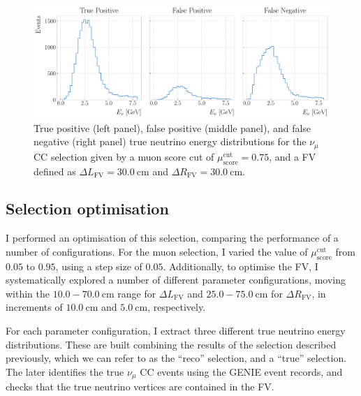 \begin{figure}[t]
    \centering
    \includegraphics[width=.99\linewidth]{Images/GAr_selection/true_numu_example_spectra_horizontal.pdf}
    \caption[True positive, false positive, and false negative true neutrino energy distributions for a $\nu_{\mu}$ CC selection.]{True positive (left panel), false positive (middle panel), and false negative (right panel) true neutrino energy distributions for the $\nu_{\mu}$ CC selection given by a muon score cut of $\mu_{\mathrm{score}}^{\mathrm{cut}} = 0.75$, and a FV defined as $\Delta L_{\mathrm{FV}} = 30.0 ~ \mathrm{cm}$ and $\Delta R_{\mathrm{FV}} = 30.0 ~ \mathrm{cm}$.}
    \label{fig:numuCC_spectra_example}
\end{figure}

\subsection{Selection optimisation}

I performed an optimisation of this selection, comparing the performance of a number of configurations. For the muon selection, I varied the value of $\mu_{\mathrm{score}}^{\mathrm{cut}}$ from $0.05$ to $0.95$, using a step size of $0.05$. Additionally, to optimise the FV, I systematically explored a number of different parameter configurations, moving within the $10.0-70.0~\mathrm{cm}$ range for $\Delta L_{\mathrm{FV}}$ and $25.0-75.0~\mathrm{cm}$ for $\Delta R_{\mathrm{FV}}$, in increments of $10.0~\mathrm{cm}$ and $5.0~\mathrm{cm}$, respectively.

For each parameter configuration, I extract three different true neutrino energy distributions. These are built combining the results of the selection described previously, which we can refer to as the ``reco'' selection, and a ``true'' selection. The later identifies the true $\nu_{\mu}$ CC events using the GENIE event records, and checks that the true neutrino vertices are contained in the FV.

